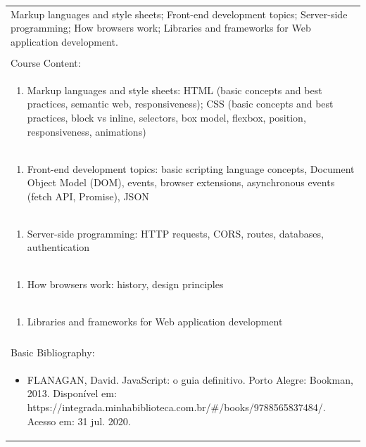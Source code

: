 \documentclass[11pt]{article}
\begin{document}
\begin{center}
\begin{longtable}{|p{4cm}|p{4cm}|p{4cm}|p{4cm}|}
\multicolumn{4}{|p{\dimexpr 16cm + 6\tabcolsep\relax}|}{Markup languages and style sheets; Front-end development topics; Server-side programming; How browsers work; Libraries and frameworks for Web application development.}\\
\multicolumn{4}{|p{16cm}|}{}\\
\hline
\multicolumn{4}{|p{16cm}|}{Course Content:}\\*
\multicolumn{4}{|p{\dimexpr 16cm + 6\tabcolsep\relax}|}{\begin{enumerate}[start=1]\item Markup languages and style sheets: HTML (basic concepts and best practices, semantic web, responsiveness); CSS (basic concepts and best practices, block vs inline, selectors, box model, flexbox, position, responsiveness, animations)\end{enumerate}}\\
\multicolumn{4}{|p{\dimexpr 16cm + 6\tabcolsep\relax}|}{\begin{enumerate}[start=2]\item Front-end development topics: basic scripting language concepts, Document Object Model (DOM), events, browser extensions, asynchronous events (fetch API, Promise), JSON\end{enumerate}}\\
\multicolumn{4}{|p{\dimexpr 16cm + 6\tabcolsep\relax}|}{\begin{enumerate}[start=3]\item Server-side programming: HTTP requests, CORS, routes, databases, authentication\end{enumerate}}\\
\multicolumn{4}{|p{\dimexpr 16cm + 6\tabcolsep\relax}|}{\begin{enumerate}[start=4]\item How browsers work: history, design principles\end{enumerate}}\\
\multicolumn{4}{|p{\dimexpr 16cm + 6\tabcolsep\relax}|}{\begin{enumerate}[start=5]\item Libraries and frameworks for Web application development\end{enumerate}}\\
\multicolumn{4}{|p{\dimexpr 16cm + 6\tabcolsep\relax}|}{}\\
\hline
\multicolumn{4}{|p{16cm}|}{Basic Bibliography:}\\*
\multicolumn{4}{|p{\dimexpr 16cm + 6\tabcolsep\relax}|}{\begin{itemize}\item FLANAGAN, David. JavaScript: o guia definitivo. Porto Alegre: Bookman, 2013. Disponível em: https://integrada.minhabiblioteca.com.br/\#/books/9788565837484/. Acesso em: 31 jul. 2020.\end{itemize}}\\

\end{longtable}
\end{center}
\end{document}
